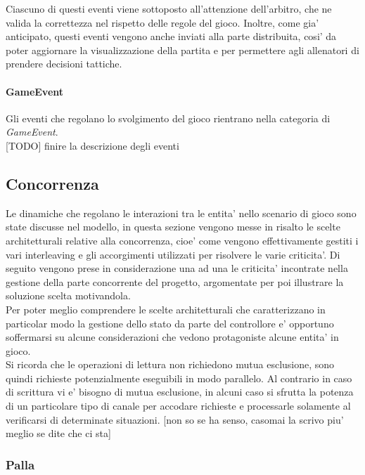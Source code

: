 Ciascuno di questi eventi viene sottoposto all'attenzione dell'arbitro, che ne valida la correttezza nel rispetto delle regole del gioco. Inoltre, come gia' anticipato, questi eventi vengono anche inviati alla parte distribuita, cosi' da poter aggiornare la visualizzazione della partita e per permettere agli allenatori di prendere decisioni tattiche.

\paragraph{GameEvent} Gli eventi che regolano lo svolgimento del gioco rientrano nella categoria di \textit{GameEvent}. \\

[TODO] finire la descrizione degli eventi

\subsection{Concorrenza}
\label{sec:analisi_concorrenza}

Le dinamiche che regolano le interazioni tra le entita' nello scenario di gioco sono state discusse nel modello, in questa sezione vengono messe in risalto le scelte architetturali relative alla concorrenza, cioe' come vengono effettivamente gestiti i vari interleaving e gli accorgimenti utilizzati per risolvere le varie criticita'. Di seguito vengono prese in considerazione una ad una le criticita' incontrate nella gestione della parte concorrente del progetto, argomentate per poi illustrare la soluzione scelta motivandola.\\

Per poter meglio comprendere le scelte architetturali che caratterizzano in particolar modo la gestione dello stato da parte del controllore e' opportuno soffermarsi su alcune considerazioni che vedono protagoniste alcune entita' in gioco.\\

Si ricorda che le operazioni di lettura non richiedono mutua esclusione, sono quindi richieste potenzialmente eseguibili in modo parallelo. Al contrario in caso di scrittura vi e' bisogno di mutua esclusione, in alcuni caso si sfrutta la potenza di un particolare tipo di canale per accodare richieste e processarle solamente al verificarsi di determinate situazioni. [non so se ha senso, casomai la scrivo piu' meglio se dite che ci sta]

\subsubsection{Palla}
\label{sec:analisi_concorrenza_palla}

